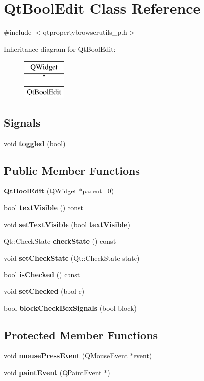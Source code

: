 \section{Qt\+Bool\+Edit Class Reference}
\label{classQtBoolEdit}


{\ttfamily \#include $<$qtpropertybrowserutils\+\_\+p.\+h$>$}

Inheritance diagram for Qt\+Bool\+Edit\+:\begin{figure}[H]
\begin{center}
\leavevmode
\includegraphics[height=2.000000cm]{classQtBoolEdit}
\end{center}
\end{figure}
\subsection*{Signals}
\begin{DoxyCompactItemize}
\item 
void {\bf toggled} (bool)
\end{DoxyCompactItemize}
\subsection*{Public Member Functions}
\begin{DoxyCompactItemize}
\item 
{\bf Qt\+Bool\+Edit} (Q\+Widget $\ast$parent=0)
\item 
bool {\bf text\+Visible} () const 
\item 
void {\bf set\+Text\+Visible} (bool {\bf text\+Visible})
\item 
Qt\+::\+Check\+State {\bf check\+State} () const 
\item 
void {\bf set\+Check\+State} (Qt\+::\+Check\+State state)
\item 
bool {\bf is\+Checked} () const 
\item 
void {\bf set\+Checked} (bool c)
\item 
bool {\bf block\+Check\+Box\+Signals} (bool block)
\end{DoxyCompactItemize}
\subsection*{Protected Member Functions}
\begin{DoxyCompactItemize}
\item 
void {\bf mouse\+Press\+Event} (Q\+Mouse\+Event $\ast$event)
\item 
void {\bf paint\+Event} (Q\+Paint\+Event $\ast$)
\end{DoxyCompactItemize}


